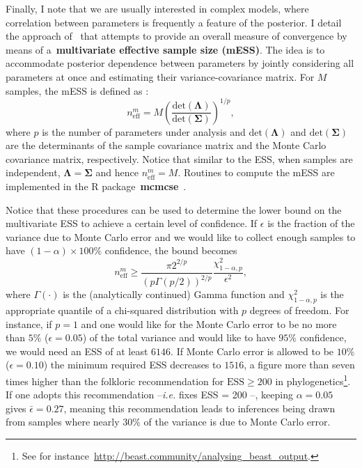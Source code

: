 Finally, I note  that we are usually interested in complex models, where correlation between parameters is frequently a feature of the posterior.
I detail the approach of~\cite{Vats2015} that attempts to provide an overall measure of convergence by means of a~\textbf{multivariate effective sample size (mESS)}.
The idea is to accommodate posterior dependence between parameters by jointly considering all parameters at once and estimating their variance-covariance matrix.
For $M$ samples, the mESS is defined as :
\begin{equation}
 \label{eq:multiESS}
 n_{\text{eff}}^m = M\left(\frac{\text{det}(\boldsymbol\Lambda)}{\text{det}(\boldsymbol\Sigma)}\right)^{1/p},
\end{equation}
where $p$ is the number of parameters under analysis and $\text{det}(\boldsymbol\Lambda)$ and $\text{det}(\boldsymbol\Sigma)$ are the determinants of the sample covariance matrix and the Monte Carlo covariance matrix, respectively.
Notice that similar to the ESS, when samples are independent, $\boldsymbol\Lambda = \boldsymbol\Sigma$ and hence $ n_{\text{eff}}^m = M$.
Routines to compute the mESS are implemented in the R package~\textbf{mcmcse}~\citep{Flegal2017}.

Notice that these procedures can be used to determine the lower bound on the multivariate ESS to achieve a certain level of confidence.
If $\epsilon$ is the fraction of the variance due to Monte Carlo error and we would like to collect enough samples to have $(1-\alpha)\times 100 \%$ confidence, the bound becomes
\begin{equation}
 \label{eq:mESSbound}
  n_{\text{eff}}^m  \geq \frac{\pi2^{2/p}}{(p \Gamma(p/2))^{2/p}} \frac{\chi^2_{1-\alpha, p}}{\epsilon^2},
\end{equation}
where $\Gamma(\cdot)$ is the (analytically continued) Gamma function and  $\chi^2_{1-\alpha, p}$ is the appropriate quantile of a chi-squared distribution with $p$ degrees of freedom.
For instance, if $p=1$ and one would like for the Monte Carlo error to be no more than $5\%$ ($\epsilon = 0.05$) of the total variance and would like to have $95\%$ confidence, we would need an ESS of at least $6146$.
If Monte Carlo error is allowed to be $10\%$ ($\epsilon = 0.10$) the minimum required ESS decreases to $1516$, a figure more than seven times higher than the folkloric recommendation for $\text{ESS} \geq 200$ in phylogenetics\footnote{See for instance~\url{http://beast.community/analysing_beast_output}.}.
If one adopts this recommendation --\textit{i.e.} fixes ESS = 200 --, keeping $\alpha = 0.05$ gives $\bar{\epsilon} = 0.27$, meaning this recommendation leads to inferences being drawn from samples where nearly 30\% of the variance is due to Monte Carlo error.


